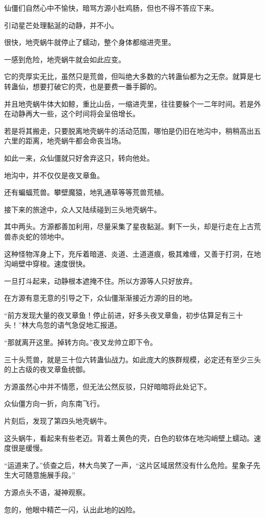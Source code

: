 \begin{this_body}
仙僵们自然心中不愉快，暗骂方源小肚鸡肠，但也不得不答应下来。

引动星芒处理黏涎的动静，并不小。

很快，地壳蜗牛就停止了蠕动，整个身体都缩进壳里。

一感到危险，地壳蜗牛就会如此应变。

它的壳厚实无比，虽然只是荒兽，但叫绝大多数的六转蛊仙都为之无奈。就算是七转蛊仙，想要打破它的壳，也是要费一番手脚的。

并且地壳蜗牛体大如鲸，重比山岳，一缩进壳里，往往要躲个一二年时间。若是外在动静再大一些，这个时间将会呈倍增长。

若是将其搬走，只要脱离地壳蜗牛的活动范围，哪怕是仍旧在地沟中，稍稍高出五六里的距离，地壳蜗牛都会命丧当场。

如此一来，众仙僵就只好舍弃这只，转向他处。

地沟中，并不仅仅是夜叉章鱼。

还有蝙蝠荒兽。攀壁魔猿，地乳通草等等荒兽荒植。

接下来的旅途中，众人又陆续碰到三头地壳蜗牛。

其中两头。方源都善加利用，尽量采集了星夜黏涎。剩下一头，却是行走在上古荒兽赤炎蛇的领地中。

这种怪物浑身上下，充斥着暗道、炎道、土道道痕，极其难缠，又善于打洞，在地沟峭壁中穿梭。速度很快。

一旦打斗起来，动静根本遮掩不住。所以方源等人只好放弃。

在方源有意无意的引导之下，众仙僵渐渐接近方源的目的地。

“前方发现大量的夜叉章鱼！停止前进，好多头夜叉章鱼，初步估算足有三十头！”林大鸟忽的语气急促地汇报道。

“那就离开这里。掉转方向。”夜叉龙帅立即下令。

三十头荒兽，就是三十位六转蛊仙战力。如此庞大的族群规模，必定还有至少三头的上古级的夜叉章鱼统御。

方源虽然心中并不情愿，但无法公然反驳，只好暗暗将此处记下。

众仙僵方向一折，向东南飞行。

片刻后，发现了第四头地壳蜗牛。

这头蜗牛，看起来有些老迈。背着土黄色的壳，白色的软体在地沟峭壁上蠕动。速度很是缓慢。

“运道来了。”侦查之后，林大鸟笑了一声，“这片区域居然没有什么危险。星象子先生大可随意施展手段。”

方源点头不语，凝神观察。

忽的，他眼中精芒一闪，认出此地的凶险。


\end{this_body}

